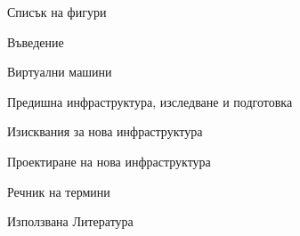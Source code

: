 \documentclass[11pt, a4paper]{article}
\renewcommand{\listoffigures}{Списък на фигури}
\begin{document}
		
	\newpage
	\clearpage	
	\tableofcontents
	\newpage
	\listoffigures
		\newpage
		\listoftables
			\newpage
	
	
	{Въведение}\label{Introduction}
	\newpage
	
	
	{Виртуални машини}\label{Sect1}
	\newpage
	
	
	{Предишна инфраструктура, изследване и подготовка}\label{Sect2}
	\newpage
	
	
	{Изисквания за нова инфраструктура}\label{Sect3}
	\newpage
	
	
	{Проектиране на нова инфраструктура}\label{Sect4}
	\newpage
	
	
	{Речник на термини}\label{Sect5}
	\newpage
	
	
	{Използвана Литература}\label{Sect7}
	\newpage
	
	
	\label{Ackn}
	
	\newpage
%

%


%
\end{document}
